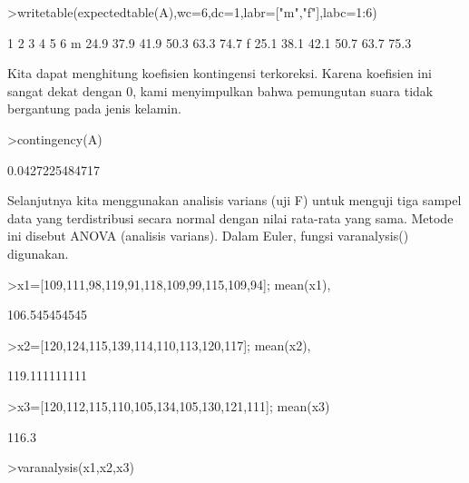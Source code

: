\documentclass[a4paper,10pt]{article}
\begin{document}
\begin{eulernotebook}
\begin{eulercomment}
\begin{eulercomment}
\begin{eulercomment}
\begin{eulercomment}
\begin{eulercomment}
\begin{eulercomment}
\begin{eulercomment}
\begin{eulercomment}
\begin{eulercomment}
\begin{eulercomment}
\begin{eulercomment}
\begin{eulercomment}
\begin{eulercomment}
\begin{eulercomment}
\begin{eulercomment}
\begin{eulercomment}
\begin{eulercomment}
\begin{eulercomment}
\begin{eulerprompt}
>writetable(expectedtable(A),wc=6,dc=1,labr=["m","f"],labc=1:6)
\end{eulerprompt}
\begin{euleroutput}
             1     2     3     4     5     6
       m  24.9  37.9  41.9  50.3  63.3  74.7
       f  25.1  38.1  42.1  50.7  63.7  75.3
\end{euleroutput}
\begin{eulercomment}
Kita dapat menghitung koefisien kontingensi terkoreksi. Karena
koefisien ini sangat dekat dengan 0, kami menyimpulkan bahwa
pemungutan suara tidak bergantung pada jenis kelamin.
\end{eulercomment}
\begin{eulerprompt}
>contingency(A)
\end{eulerprompt}
\begin{euleroutput}
  0.0427225484717
\end{euleroutput}
\begin{eulercomment}
\begin{eulercomment}
\begin{eulercomment}
Selanjutnya kita menggunakan analisis varians (uji F) untuk menguji
tiga sampel data yang terdistribusi secara normal dengan nilai
rata-rata yang sama. Metode ini disebut ANOVA (analisis varians).
Dalam Euler, fungsi varanalysis() digunakan.
\end{eulercomment}
\begin{eulerprompt}
>x1=[109,111,98,119,91,118,109,99,115,109,94]; mean(x1),
\end{eulerprompt}
\begin{euleroutput}
  106.545454545
\end{euleroutput}
\begin{eulerprompt}
>x2=[120,124,115,139,114,110,113,120,117]; mean(x2),
\end{eulerprompt}
\begin{euleroutput}
  119.111111111
\end{euleroutput}
\begin{eulerprompt}
>x3=[120,112,115,110,105,134,105,130,121,111]; mean(x3)
\end{eulerprompt}
\begin{euleroutput}
  116.3
\end{euleroutput}
\begin{eulerprompt}
>varanalysis(x1,x2,x3)
\end{eulerprompt}

\end{eulercomment}
\end{eulercomment}
\end{eulercomment}
\end{eulercomment}
\end{eulercomment}
\end{eulercomment}
\end{eulercomment}
\end{eulercomment}
\end{eulercomment}
\end{eulercomment}
\end{eulercomment}
\end{eulercomment}
\end{eulercomment}
\end{eulercomment}
\end{eulercomment}
\end{eulercomment}
\end{eulercomment}
\end{eulercomment}
\end{eulercomment}
\end{eulercomment}
\end{eulernotebook}
\end{document}

